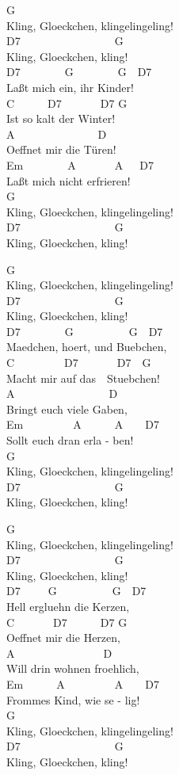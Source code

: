 \documentclass[
  letterpaper,
  a5paper]{memoir}
\begin{document}
G\\
Kling, Gloeckchen, klingelingeling!\\
D7~~~~~~~~~~~~~~~~~G\\
Kling, Gloeckchen, kling!\\
D7~~~~~~~~G~~~~~~~~G~~D7\\
Laßt mich ein, ihr Kinder!\\
C~~~~~~D7~~~~~~~D7 G\\
Ist so kalt der Winter!\\
A~~~~~~~~~~~~~~~D\\
Oeffnet mir die Türen!\\
Em~~~~~~~~A~~~~~~~A~~~D7\\
Laßt mich nicht erfrieren!\\
G\\
Kling, Gloeckchen, klingelingeling!\\
D7~~~~~~~~~~~~~~~~~G\\
Kling, Gloeckchen, kling!~~

G\\
Kling, Gloeckchen, klingelingeling!\\
D7~~~~~~~~~~~~~~~~~G\\
Kling, Gloeckchen, kling!\\
D7~~~~~~~~G~~~~~~~~~~G~~D7\\
Maedchen, hoert, und Buebchen,\\
C~~~~~~~~~D7~~~~~~~D7~~G\\
Macht mir auf das~~Stuebchen!\\
A~~~~~~~~~~~~~~~~~D\\
Bringt euch viele Gaben,\\
Em~~~~~~~~~A~~~~~~A~~~~D7\\
Sollt euch dran erla - ben!\\
G\\
Kling, Gloeckchen, klingelingeling!\\
D7~~~~~~~~~~~~~~~~~G\\
Kling, Gloeckchen, kling!~~

G\\
Kling, Gloeckchen, klingelingeling!\\
D7~~~~~~~~~~~~~~~~~G\\
Kling, Gloeckchen, kling!\\
D7~~~~~G~~~~~~~~~~G~~D7\\
Hell ergluehn die Kerzen,\\
C~~~~~~~D7~~~~~~D7 G\\
Oeffnet mir die Herzen,\\
A~~~~~~~~~~~~~~~~D\\
Will drin wohnen froehlich,\\
Em~~~~~~A~~~~~~~~~A~~~~D7\\
Frommes Kind, wie se - lig!\\
G\\
Kling, Gloeckchen, klingelingeling!\\
D7~~~~~~~~~~~~~~~~~G\\
Kling, Gloeckchen, kling!
\end{document}
